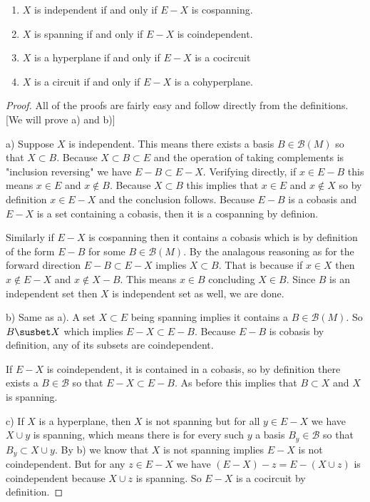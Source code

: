     \begin{enumerate}
        \item $X$ is independent if and only if $E-X$ is cospanning.

        \item $X$ is spanning if and only if $E-X$ is coindependent.

        \item $X$ is a hyperplane if and only if $E-X$ is a cocircuit

        \item $X$ is a circuit if and only if $E-X$ is a cohyperplane.
    \end{enumerate}



\begin{proof}
    All of the proofs are fairly easy and follow directly from the definitions. [We will prove a) and b)]

    a) Suppose $X$ is independent. This means there exists a basis $B \in \mathcal{B}(M)$ so that $X \subset B$. Because $X \subset B \subset E$ and the operation of taking complements is "inclusion reversing" we have $E-B \subset E - X$. Verifying directly, if $x \in E - B$ this means $x \in E$ and $x \notin B$. Because $X \subset B$ this implies that $x \in E$ and $x \notin X$ so by definition $x \in E - X$ and the conclusion follows. Because $E - B$ is a cobasis and $E - X$ is a set containing a cobasis, then it is a cospanning by definion.

    Similarly if $E - X$ is cospanning then it contains a cobasis which is by definition of the form $E - B$ for some $B \in \mathcal{B}(M)$. By the analagous reasoning as for the forward direction $E - B \subset E - X$ implies $X \subset B$. That is because if $x \in X$ then $x \notin E - X$ and $x \notin X - B$. This means $x \in B$ concluding $X \in B$. Since $B$ is an independent set then $X$ is independent set as well, we are done.

    b) Same as a). A set $X\subset E$ being spanning implies it contains a $B \in \mathcal{B}(M)$. So  $B \susbet X$ which implies $E - X \subset E - B$. Because $E - B$ is cobasis by definition, any of its subsets are coindependent. 

    If $E - X$ is coindependent, it is contained in a cobasis, so by definition there exists a $B \in \mathcal{B}$ so that $E - X \subset E - B$. As before this implies that $B \subset X$ and $X$ is spanning.

    c)  If $X$ is a hyperplane, then $X$ is not spanning but for all $y \in E - X$ we have $X \cup y$ is spanning, which means there is for every such $y$ a basis $B_y \in \mathcal{B}$ so that $B_y \subset X \cup y $. By b) we know that $X$ is not spanning implies $E - X$ is not coindependent. But for any $z \in E - X$ we have $(E-X)-z = E - (X \cup z)$ is coindependent because $X \cup z$ is spanning. So $E - X$ is a cocircuit by definition.


\end{proof}
